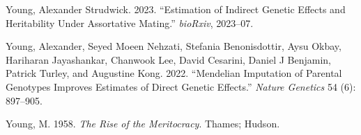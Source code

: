 \documentclass[
  12pt,
]{article}
\newlength{\cslhangindent}
\newlength{\cslentryspacingunit} %
\newenvironment{CSLReferences}[2] %
 {%
  \setlength{\parindent}{0pt}
  \ifodd #1
  \let\oldpar\par
  \def\par{\hangindent=\cslhangindent\oldpar}
  \fi
  \setlength{\parskip}{#2\cslentryspacingunit}
 }%
 {}
\theoremstyle{definition}
\theoremstyle{definition}
\theoremstyle{definition}
\theoremstyle{definition}
\theoremstyle{remark}
\begin{document}
\begin{CSLReferences}{1}{0}
\leavevmode{}%
Young, Alexander Strudwick. 2023. {``Estimation of Indirect Genetic Effects and Heritability Under Assortative Mating.''} \emph{bioRxiv}, 2023--07.

\leavevmode{}%
Young, Alexander, Seyed Moeen Nehzati, Stefania Benonisdottir, Aysu Okbay, Hariharan Jayashankar, Chanwook Lee, David Cesarini, Daniel J Benjamin, Patrick Turley, and Augustine Kong. 2022. {``Mendelian Imputation of Parental Genotypes Improves Estimates of Direct Genetic Effects.''} \emph{Nature Genetics} 54 (6): 897--905.

\leavevmode{}%
Young, M. 1958. \emph{The Rise of the Meritocracy}. Thames; Hudson.

\end{CSLReferences}
\end{document}
